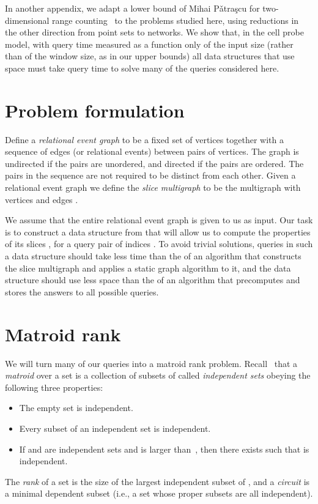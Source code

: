 \documentclass[11pt]{article}
\begin{document}
In another appendix, we adapt a lower bound of Mihai P{\v a}tra{\c s}cu for two-dimensional range counting~\cite{Pat-STOC-07} to the problems studied here, using reductions in the other direction from point sets to networks. We show that, in the cell probe model, with query time measured as a function only of the input size (rather than of the window size, as in our upper bounds) all data structures that use space  must take  query time to solve many of the queries considered here.

\section{Problem formulation}
Define a \emph{relational event graph}  to be a fixed set of vertices  together with a sequence of edges (or relational events)  between pairs of vertices. The graph is undirected if the pairs are unordered, and directed if the pairs are ordered. The pairs in the sequence are not required to be distinct from each other.
Given a relational event graph  we define the \emph{slice multigraph}  to be the multigraph with vertices  and edges .

We assume that the entire relational event graph  is given to us as input.  Our task is to construct a data structure from  that will allow us to compute the properties of its slices , for a query pair of indices . To avoid trivial solutions, queries in such a data structure should take less time than the  of an algorithm that constructs the slice multigraph and applies a static graph algorithm to it, and the data structure should use less space than the  of an algorithm that precomputes and stores the answers to all possible queries.

\section{Matroid rank}
We will turn many of our queries into a matroid rank problem. Recall~\cite{Lawler01, Welsh10} that a \emph{matroid} over a set  is a collection of subsets of  called \emph{independent sets} 
obeying the following three properties:
\begin{itemize}
\item The empty set is independent.
\item Every subset of an independent set is independent.
\item If  and  are independent sets and  is larger than~, then there exists  such that  is independent.
\end{itemize}
The \emph{rank} of a set  is the size of the largest independent subset of , and a \emph{circuit} is a minimal dependent subset (i.e., a set whose proper subsets are all independent).
\end{document}
